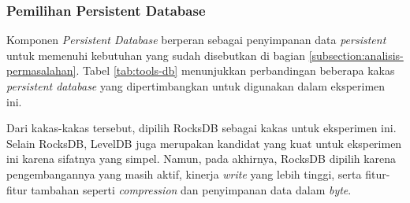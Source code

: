 \subsubsection{Pemilihan Persistent Database}
\label{subsubsection:persistent-database}

Komponen \textit{Persistent Database} berperan sebagai penyimpanan data \textit{persistent} untuk memenuhi kebutuhan yang sudah disebutkan di bagian \ref{subsection:analisis-permasalahan}. Tabel \ref{tab:tools-db} menunjukkan perbandingan beberapa kakas \textit{persistent database} yang dipertimbangkan untuk digunakan dalam eksperimen ini.

Dari kakas-kakas tersebut, dipilih RocksDB sebagai kakas untuk eksperimen ini. Selain RocksDB, LevelDB juga merupakan kandidat yang kuat untuk eksperimen ini karena sifatnya yang simpel. Namun, pada akhirnya, RocksDB dipilih karena pengembangannya yang masih aktif, kinerja \textit{write} yang lebih tinggi, serta fitur-fitur tambahan seperti \textit{compression} dan penyimpanan data dalam \textit{byte}.


